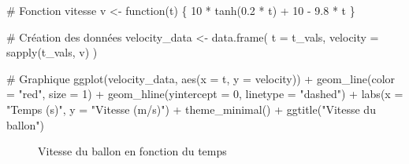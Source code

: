 \documentclass[
  12pt,
  letterpaper,
]{book}
\newenvironment{Shaded}{}{}
\newcommand{\AttributeTok}[1]{\textcolor[rgb]{0.84,0.23,0.29}{#1}}
\newcommand{\CommentTok}[1]{\textcolor[rgb]{0.42,0.45,0.49}{#1}}
\newcommand{\ControlFlowTok}[1]{\textcolor[rgb]{0.84,0.23,0.29}{#1}}
\newcommand{\DecValTok}[1]{\textcolor[rgb]{0.00,0.36,0.77}{#1}}
\newcommand{\FloatTok}[1]{\textcolor[rgb]{0.00,0.36,0.77}{#1}}
\newcommand{\FunctionTok}[1]{\textcolor[rgb]{0.44,0.26,0.76}{#1}}
\newcommand{\NormalTok}[1]{\textcolor[rgb]{0.14,0.16,0.18}{#1}}
\newcommand{\OtherTok}[1]{\textcolor[rgb]{0.44,0.26,0.76}{#1}}
\newcommand{\SpecialCharTok}[1]{\textcolor[rgb]{0.00,0.36,0.77}{#1}}
\newcommand{\StringTok}[1]{\textcolor[rgb]{0.01,0.18,0.38}{#1}}
\theoremstyle{remark}
\begin{document}
\begin{Shaded}
\begin{Highlighting}[]
\CommentTok{\# Fonction vitesse}
\NormalTok{v }\OtherTok{\textless{}{-}} \ControlFlowTok{function}\NormalTok{(t) \{}
  \DecValTok{10} \SpecialCharTok{*} \FunctionTok{tanh}\NormalTok{(}\FloatTok{0.2} \SpecialCharTok{*}\NormalTok{ t) }\SpecialCharTok{+} \DecValTok{10} \SpecialCharTok{{-}} \FloatTok{9.8} \SpecialCharTok{*}\NormalTok{ t}
\NormalTok{\}}

\CommentTok{\# Création des données}
\NormalTok{velocity\_data }\OtherTok{\textless{}{-}} \FunctionTok{data.frame}\NormalTok{(}
  \AttributeTok{t =}\NormalTok{ t\_vals,}
  \AttributeTok{velocity =} \FunctionTok{sapply}\NormalTok{(t\_vals, v)}
\NormalTok{)}

\CommentTok{\# Graphique}
\FunctionTok{ggplot}\NormalTok{(velocity\_data, }\FunctionTok{aes}\NormalTok{(}\AttributeTok{x =}\NormalTok{ t, }\AttributeTok{y =}\NormalTok{ velocity)) }\SpecialCharTok{+}
  \FunctionTok{geom\_line}\NormalTok{(}\AttributeTok{color =} \StringTok{"red"}\NormalTok{, }\AttributeTok{size =} \DecValTok{1}\NormalTok{) }\SpecialCharTok{+}
  \FunctionTok{geom\_hline}\NormalTok{(}\AttributeTok{yintercept =} \DecValTok{0}\NormalTok{, }\AttributeTok{linetype =} \StringTok{"dashed"}\NormalTok{) }\SpecialCharTok{+}
  \FunctionTok{labs}\NormalTok{(}\AttributeTok{x =} \StringTok{"Temps (s)"}\NormalTok{, }\AttributeTok{y =} \StringTok{"Vitesse (m/s)"}\NormalTok{) }\SpecialCharTok{+}
  \FunctionTok{theme\_minimal}\NormalTok{() }\SpecialCharTok{+}
  \FunctionTok{ggtitle}\NormalTok{(}\StringTok{"Vitesse du ballon"}\NormalTok{)}
\end{Highlighting}
\end{Shaded}

\begin{figure}[H]


\caption{\label{fig-vitesse}Vitesse du ballon en fonction du temps}

\end{figure}%
\end{document}
